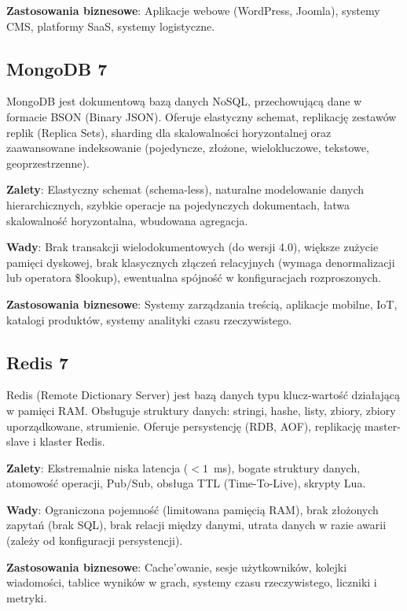 \documentclass[12pt,a4paper]{article}
\begin{document}
\textbf{Zastosowania biznesowe}: Aplikacje webowe (WordPress, Joomla), systemy CMS, platformy SaaS, systemy logistyczne.

\subsection{MongoDB 7}

MongoDB jest dokumentową bazą danych NoSQL, przechowującą dane w formacie BSON (Binary JSON). Oferuje elastyczny schemat, replikację zestawów replik (Replica Sets), sharding dla skalowalności horyzontalnej oraz zaawansowane indeksowanie (pojedyncze, złożone, wielokluczowe, tekstowe, geoprzestrzenne).

\textbf{Zalety}: Elastyczny schemat (schema-less), naturalne modelowanie danych hierarchicznych, szybkie operacje na pojedynczych dokumentach, łatwa skalowalność horyzontalna, wbudowana agregacja.

\textbf{Wady}: Brak transakcji wielodokumentowych (do wersji 4.0), większe zużycie pamięci dyskowej, brak klasycznych złączeń relacyjnych (wymaga denormalizacji lub operatora \$lookup), ewentualna spójność w konfiguracjach rozproszonych.

\textbf{Zastosowania biznesowe}: Systemy zarządzania treścią, aplikacje mobilne, IoT, katalogi produktów, systemy analityki czasu rzeczywistego.

\subsection{Redis 7}

Redis (Remote Dictionary Server) jest bazą danych typu klucz-wartość działającą w pamięci RAM. Obsługuje struktury danych: stringi, hashe, listy, zbiory, zbiory uporządkowane, strumienie. Oferuje persystencję (RDB, AOF), replikację master-slave i klaster Redis.

\textbf{Zalety}: Ekstremalnie niska latencja ($<1$~ms), bogate struktury danych, atomowość operacji, Pub/Sub, obsługa TTL (Time-To-Live), skrypty Lua.

\textbf{Wady}: Ograniczona pojemność (limitowana pamięcią RAM), brak złożonych zapytań (brak SQL), brak relacji między danymi, utrata danych w razie awarii (zależy od konfiguracji persystencji).

\textbf{Zastosowania biznesowe}: Cache'owanie, sesje użytkowników, kolejki wiadomości, tablice wyników w grach, systemy czasu rzeczywistego, liczniki i metryki.


\end{document}
